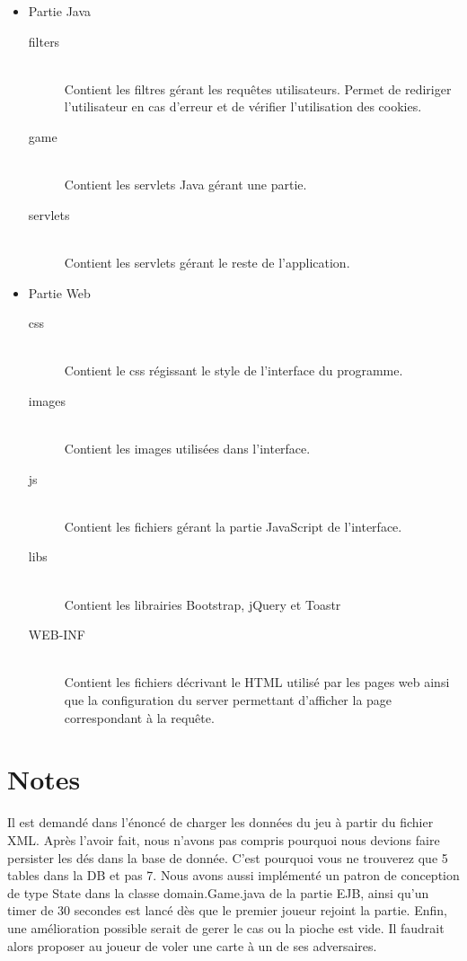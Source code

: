 \documentclass[11pt]{scrreprt}
\begin{document}
    \begin{itemize}
        \item Partie Java
        \begin{description}
            \item[filters]\hfill \\ Contient les filtres gérant les requêtes utilisateurs. Permet de rediriger l'utilisateur en cas d'erreur et de vérifier l'utilisation des cookies.
            \item[game]\hfill \\ Contient les servlets Java gérant une partie.
            \item[servlets]\hfill \\ Contient les servlets gérant le reste de l'application.
        \end{description}
        \item Partie Web
        \begin{description}
            \item[css]\hfill \\ Contient le css régissant le style de l'interface du programme.
            \item[images]\hfill \\ Contient les images utilisées dans l'interface.
            \item[js]\hfill \\ Contient les fichiers gérant la partie JavaScript de l'interface.
            \item[libs]\hfill \\ Contient les librairies Bootstrap, jQuery et Toastr
            \item[WEB-INF]\hfill \\ Contient les fichiers décrivant le HTML utilisé par les pages web ainsi que la configuration du server permettant d'afficher la page correspondant à la requête.
        \end{description}
    \end{itemize}
    \chapter{Notes}
    Il est demandé dans l'énoncé de charger les données du jeu à partir du fichier XML. Après l'avoir fait, nous n'avons pas compris pourquoi nous devions faire persister les dés dans la base de donnée. C'est pourquoi vous ne trouverez que 5 tables dans la DB et pas 7. 
    Nous avons aussi implémenté un patron de conception de type \og State\fg{} dans la classe domain.Game.java de la partie EJB, ainsi qu'un timer de 30 secondes est lancé dès que le premier joueur rejoint la partie.
    Enfin, une amélioration possible serait de gerer le cas ou la pioche est vide. Il faudrait alors proposer au joueur de voler une carte à un de ses adversaires.
\end{document}
